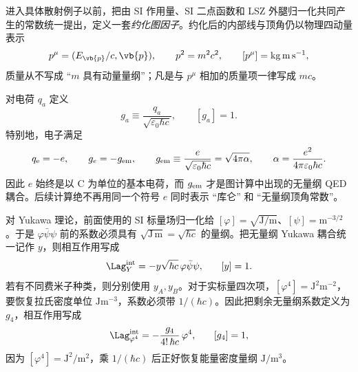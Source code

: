 
进入具体散射例子以前，把由 SI 作用量、SI 二点函数和 LSZ 外腿归一化共同产生的常数统一提出，定义一套\emph{约化图因子}。约化后的内部线与顶角仍以物理四动量表示
\begin{equation}
 p^\mu=(E_{\vb{p}}/c,\vb{p}),
 \qquad p^2=m^2c^2,
 \qquad [p^\mu]=\mathrm{kg\,m\,s^{-1}},
 \label{eq:reduced-si-physical-p-r10}
\end{equation}
质量从不写成 ``$m$ 具有动量量纲''；凡是与 $p^\mu$ 相加的质量项一律写成 $mc$。

对电荷 $q_a$ 定义
\begin{equation}
 g_a\equiv\frac{q_a}{\sqrt{\varepsilon_0\hbar c}},
 \qquad
 [g_a]=1.
 \label{eq:si-reduced-charge-coupling-r10}
\end{equation}
特别地，电子满足
\begin{equation}
 q_{\mathrm e}=-e,
 \qquad
 g_e=-g_{\rm em},
 \qquad
 g_{\rm em}\equiv\frac{e}{\sqrt{\varepsilon_0\hbar c}}
 =\sqrt{4\pi\alpha},
 \qquad
 \alpha=\frac{e^2}{4\pi\varepsilon_0\hbar c}.
 \label{eq:gem-alpha-si-r10}
\end{equation}
因此 $e$ 始终是以 C 为单位的基本电荷，而 $g_{\rm em}$ 才是图计算中出现的无量纲 QED 耦合。后续计算绝不再用同一个符号 $e$ 同时表示 ``库仑'' 和 ``无量纲顶角常数''。


对 Yukawa 理论，前面使用的 SI 标量场归一化给 $[\varphi]=\sqrt{\mathrm{J/m}}$、$[\psi]=\mathrm{m^{-3/2}}$。于是 $\varphi\bar\psi\psi$ 前的系数必须具有 $\sqrt{\mathrm{J\,m}}=\sqrt{\hbar c}$ 的量纲。把无量纲 Yukawa 耦合统一记作 $y$，则相互作用写成
\begin{equation}
 {
 \Lag_Y^{\rm int}=-y\sqrt{\hbar c}\,\varphi\bar\psi\psi,}
 \qquad [y]=1.
 \label{eq:yukawa-si-coupling-r10}
\end{equation}
若有不同费米子种类，则分别使用 $y_A,y_B$。对于实标量四次项，$[\varphi^4]=\mathrm{J^2m^{-2}}$，要恢复拉氏密度单位 $\mathrm{Jm^{-3}}$，系数必须带 $1/(\hbar c)$。因此把剩余无量纲系数定义为 $g_4$，相互作用写成
\begin{equation}
 {
 \Lag_{\varphi^4}^{\rm int}
 =-\frac{g_4}{4!\,\hbar c}\,\varphi^4,}
 \qquad [g_4]=1,
 \label{eq:phi4-si-coupling-r10}
\end{equation}
因为 $[\varphi^4]=\mathrm{J^2/m^2}$，乘 $1/(\hbar c)$ 后正好恢复能量密度量纲 $\mathrm{J/m^3}$。


